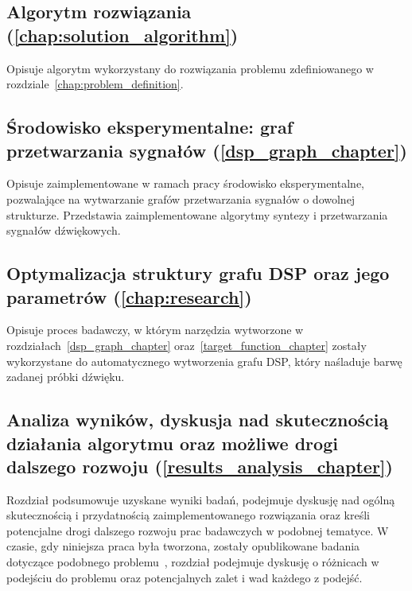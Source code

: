 \subsection*{Algorytm rozwiązania (\ref{chap:solution_algorithm})}

Opisuje algorytm wykorzystany do rozwiązania problemu
zdefiniowanego w rozdziale~\ref{chap:problem_definition}.

\subsection*{Środowisko eksperymentalne: graf przetwarzania sygnałów (\ref{dsp_graph_chapter}) }

Opisuje zaimplementowane w ramach pracy środowisko eksperymentalne, pozwalające na wytwarzanie
grafów przetwarzania sygnałów o dowolnej strukturze. Przedstawia zaimplementowane algorytmy syntezy i przetwarzania sygnałów dźwiękowych.


\subsection*{Optymalizacja struktury grafu DSP oraz jego parametrów (\ref{chap:research}) }

Opisuje proces badawczy, w którym narzędzia wytworzone w rozdziałach~\ref{dsp_graph_chapter} oraz~\ref{target_function_chapter}
zostały wykorzystane do automatycznego wytworzenia grafu DSP, który naśladuje barwę zadanej próbki dźwięku.

\subsection*{Analiza wyników, dyskusja nad skutecznością działania algorytmu oraz możliwe drogi dalszego rozwoju (\ref{results_analysis_chapter})}

Rozdział podsumowuje uzyskane wyniki badań, podejmuje dyskusję nad ogólną skutecznością i przydatnością zaimplementowanego rozwiązania oraz
kreśli potencjalne drogi dalszego rozwoju prac badawczych w podobnej tematyce. W czasie, gdy niniejsza praca była tworzona, zostały opublikowane badania
dotyczące podobnego problemu~\cite{ieee_synth_programming}, rozdział podejmuje dyskusję o różnicach w podejściu do problemu oraz potencjalnych
zalet i wad każdego z podejść.

